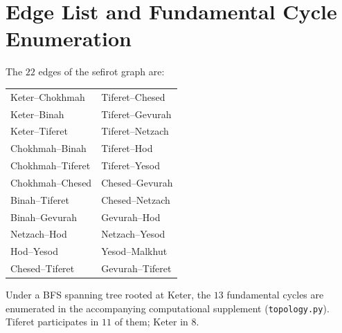 \documentclass[11pt,a4paper]{amsart}
\theoremstyle{remark}
\begin{document}
\appendix

\section{Edge List and Fundamental Cycle Enumeration}
\label{app:cycles}

The $22$ edges of the sefirot graph are:
\begin{center}
\begin{tabular}{ll}
Keter--Chokhmah    & Tiferet--Chesed \\
Keter--Binah       & Tiferet--Gevurah \\
Keter--Tiferet     & Tiferet--Netzach \\
Chokhmah--Binah    & Tiferet--Hod \\
Chokhmah--Tiferet  & Tiferet--Yesod \\
Chokhmah--Chesed   & Chesed--Gevurah \\
Binah--Tiferet     & Chesed--Netzach \\
Binah--Gevurah     & Gevurah--Hod \\
Netzach--Hod       & Netzach--Yesod \\
Hod--Yesod         & Yesod--Malkhut \\
Chesed--Tiferet    & Gevurah--Tiferet \\
\end{tabular}
\end{center}

Under a BFS spanning tree rooted at Keter, the $13$ fundamental cycles are
enumerated in the accompanying computational supplement (\texttt{topology.py}).
Tiferet participates in $11$ of them; Keter in $8$.
\end{document}
